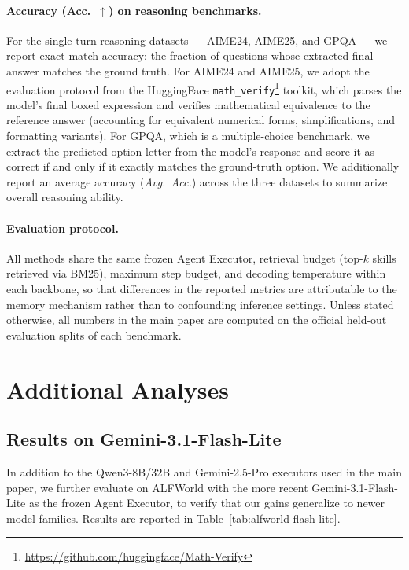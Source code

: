 \paragraph{Accuracy (Acc.\ $\uparrow$) on reasoning benchmarks.}
For the single-turn reasoning datasets --- AIME24, AIME25, and GPQA --- we report exact-match accuracy: the fraction of questions whose extracted final answer matches the ground truth. For AIME24 and AIME25, we adopt the evaluation protocol from the HuggingFace \texttt{math\_verify}\footnote{\url{https://github.com/huggingface/Math-Verify}} toolkit, which parses the model's final boxed expression and verifies mathematical equivalence to the reference answer (accounting for equivalent numerical forms, simplifications, and formatting variants). For GPQA, which is a multiple-choice benchmark, we extract the predicted option letter from the model's response and score it as correct if and only if it exactly matches the ground-truth option. We additionally report an average accuracy (\textit{Avg.\ Acc.}) across the three datasets to summarize overall reasoning ability.

\paragraph{Evaluation protocol.}
All methods share the same frozen Agent Executor, retrieval budget (top-$k$ skills retrieved via BM25), maximum step budget, and decoding temperature within each backbone, so that differences in the reported metrics are attributable to the memory mechanism rather than to confounding inference settings. Unless stated otherwise, all numbers in the main paper are computed on the official held-out evaluation splits of each benchmark.

\section{Additional Analyses}\label{app: additional_analysis}

\subsection{Results on Gemini-3.1-Flash-Lite}
\label{sec:appendix-gemini-flash}

In addition to the Qwen3-8B/32B and Gemini-2.5-Pro executors used in the main paper, we further evaluate \ours{} on ALFWorld with the more recent Gemini-3.1-Flash-Lite as the frozen Agent Executor, to verify that our gains generalize to newer model families. Results are reported in Table~\ref{tab:alfworld-flash-lite}.

